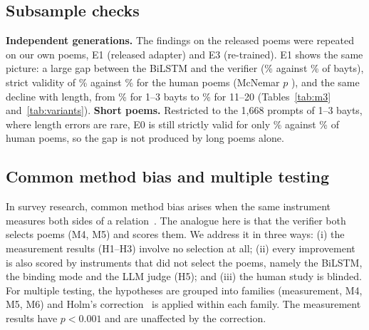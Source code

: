 \subsection{Subsample checks}
\textbf{Independent generations.} The findings on the released poems were repeated on our own poems, E1 (released
adapter) and E3 (re-trained). E1 shows the same picture: a large gap between the BiLSTM and the verifier
(\% against \% of bayts), strict validity of \% against
\% for the human poems (McNemar $p$ ), and the same decline with length, from
\% for 1--3 bayts to \% for 11--20 (Tables~\ref{tab:m3} and~\ref{tab:variants}).
\textbf{Short poems.} Restricted to the 1,668 prompts of 1--3 bayts, where length errors are rare, E0 is still strictly
valid for only \% against \% of human poems, so the gap is not produced by long poems
alone.

\subsection{Common method bias and multiple testing}
In survey research, common method bias arises when the same instrument measures both sides of a
relation~\cite{podsakoff2003cmb}. The analogue here is that the verifier both selects poems (M4, M5) and scores them.
We address it in three ways: (i) the measurement results (H1--H3) involve no selection at all; (ii) every improvement
is also scored by instruments that did not select the poems, namely the BiLSTM, the binding mode and the LLM judge
(H5); and (iii) the human study is blinded. For multiple testing, the hypotheses are grouped into families (measurement,
M4, M5, M6) and Holm's correction~\cite{holm1979simple} is applied within each family. The measurement results have
$p<0.001$ and are unaffected by the correction.
